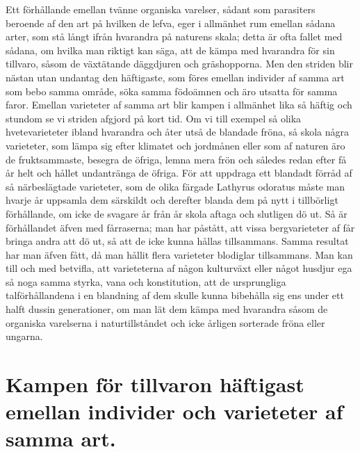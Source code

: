 Ett förhållande emellan tvänne organiska varelser, sådant som parasiters beroende af den art på hvilken de lefva, eger i allmänhet rum emellan sådana arter, som stå långt ifrån hvarandra på naturens skala; detta är ofta fallet med sådana, om hvilka man riktigt kan säga, att de kämpa med hvarandra för sin tillvaro, såsom de växtätande däggdjuren och gräshopporna. Men den striden blir nästan utan undantag den häftigaste, som föres emellan individer af samma art som bebo samma område, söka samma födoämnen och äro utsatta för samma faror. Emellan varieteter af samma art blir kampen i allmänhet lika så häftig och stundom se vi striden afgjord på kort tid. Om vi till exempel så olika hvetevarieteter ibland hvarandra och åter utså de blandade fröna, så skola några varieteter, som lämpa sig efter klimatet och jordmånen eller som af naturen äro de fruktsammaste, besegra de öfriga, lemna mera frön och således redan efter få år helt och hållet undantränga de öfriga. För att uppdraga ett blandadt förråd af så närbeslägtade varieteter, som de olika färgade Lathyrus odoratus måste man hvarje år uppsamla dem särskildt och derefter blanda dem på nytt i tillbörligt förhållande, om icke de svagare år från år skola aftaga och slutligen dö ut. Så är förhållandet äfven med fårraserna; man har påstått, att vissa bergvarieteter af får bringa andra att dö ut, så att de icke kunna hållas tillsammans. Samma resultat har man äfven fått, då man hållit flera varieteter blodiglar tillsammans. Man kan till och med betvifla, att varieteterna af någon kulturväxt eller något husdjur ega så noga samma styrka, vana och konstitution, att de ursprungliga talförhållandena i en blandning af dem skulle kunna bibehålla sig ens under ett halft dussin generationer, om man lät dem kämpa med hvarandra såsom de organiska varelserna i naturtillståndet och icke årligen sorterade fröna eller ungarna.



\section[Individer av samma art]{Kampen för tillvaron häftigast emellan individer och varieteter af samma art.}

